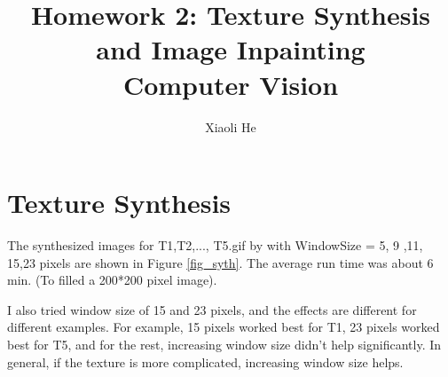 \documentclass{extarticle}
\theoremstyle{definition}
\theoremstyle{definition}
\begin{document}
\title{Homework 2: Texture Synthesis and Image Inpainting \\
	Computer Vision}
\author{Xiaoli He}
\maketitle
\newpage

\section{Texture Synthesis}
The synthesized images for T1,T2,..., T5.gif by with WindowSize = 5, 9 ,11, 15,23 pixels are shown in Figure \ref{fig_syth}. The average run time was about 6 min. (To filled a 200*200 pixel image).

I also tried window size of 15 and 23 pixels, and the effects are different for different examples. For example, 15 pixels worked best for T1, 23 pixels worked best for T5, and for the rest, increasing window size didn't help significantly. In general, if the texture is more complicated, increasing window size helps. 
\end{document}
